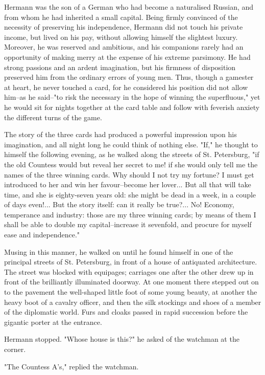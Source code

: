 Hermann was the son of a German who had become a naturalised Russian,
and from whom he had inherited a small capital. Being firmly convinced
of the necessity of preserving his independence, Hermann did not touch
his private income, but lived on his pay, without allowing himself the
slightest luxury. Moreover, he was reserved and ambitious, and his
companions rarely had an opportunity of making merry at the expense of
his extreme parsimony. He had strong passions and an ardent
imagination, but his firmness of disposition preserved him from the
ordinary errors of young men. Thus, though a gamester at heart, he
never touched a card, for he considered his position did not allow
him--as he said--"to risk the necessary in the hope of winning the
superfluous," yet he would sit for nights together at the card table
and follow with feverish anxiety the different turns of the game.

The story of the three cards had produced a powerful impression upon
his imagination, and all night long he could think of nothing else.
"If," he thought to himself the following evening, as he walked along
the streets of St. Petersburg, "if the old Countess would but reveal
her secret to me! if she would only tell me the names of the three
winning cards. Why should I not try my fortune? I must get introduced
to her and win her favour--become her lover... But all that will take
time, and she is eighty-seven years old: she might be dead in a week,
in a couple of days even!... But the story itself: can it really be
true?... No! Economy, temperance and industry: those are my three
winning cards; by means of them I shall be able to double my
capital--increase it sevenfold, and procure for myself ease and
independence."

Musing in this manner, he walked on until he found himself in one of
the principal streets of St. Petersburg, in front of a house of
antiquated architecture. The street was blocked with equipages;
carriages one after the other drew up in front of the brilliantly
illuminated doorway. At one moment there stepped out on to the
pavement the well-shaped little foot of some young beauty, at another
the heavy boot of a cavalry officer, and then the silk stockings and
shoes of a member of the diplomatic world. Furs and cloaks passed in
rapid succession before the gigantic porter at the entrance.

Hermann stopped. "Whose house is this?" he asked of the watchman at
the corner.

"The Countess A's," replied the watchman.

